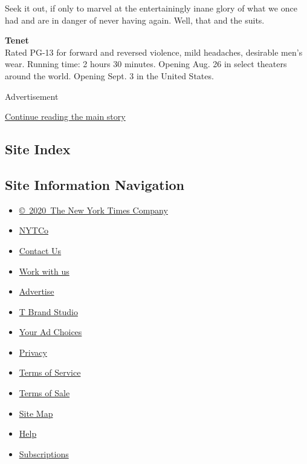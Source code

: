 Seek it out, if only to marvel at the entertainingly inane glory of what
we once had and are in danger of never having again. Well, that and the
suits.

\textbf{Tenet}\\
Rated PG-13 for forward and reversed violence, mild headaches, desirable
men's wear. Running time: 2 hours 30 minutes. Opening Aug. 26 in select
theaters around the world. Opening Sept. 3 in the United States.

Advertisement

\protect\hyperlink{after-bottom}{Continue reading the main story}

\hypertarget{site-index}{%
\subsection{Site Index}\label{site-index}}

\hypertarget{site-information-navigation}{%
\subsection{Site Information
Navigation}\label{site-information-navigation}}

\begin{itemize}
\tightlist
\item
  \href{https://help.nytimes3xbfgragh.onion/hc/en-us/articles/115014792127-Copyright-notice}{©~2020~The
  New York Times Company}
\end{itemize}

\begin{itemize}
\tightlist
\item
  \href{https://www.nytco.com/}{NYTCo}
\item
  \href{https://help.nytimes3xbfgragh.onion/hc/en-us/articles/115015385887-Contact-Us}{Contact
  Us}
\item
  \href{https://www.nytco.com/careers/}{Work with us}
\item
  \href{https://nytmediakit.com/}{Advertise}
\item
  \href{http://www.tbrandstudio.com/}{T Brand Studio}
\item
  \href{https://www.nytimes3xbfgragh.onion/privacy/cookie-policy\#how-do-i-manage-trackers}{Your
  Ad Choices}
\item
  \href{https://www.nytimes3xbfgragh.onion/privacy}{Privacy}
\item
  \href{https://help.nytimes3xbfgragh.onion/hc/en-us/articles/115014893428-Terms-of-service}{Terms
  of Service}
\item
  \href{https://help.nytimes3xbfgragh.onion/hc/en-us/articles/115014893968-Terms-of-sale}{Terms
  of Sale}
\item
  \href{https://spiderbites.nytimes3xbfgragh.onion}{Site Map}
\item
  \href{https://help.nytimes3xbfgragh.onion/hc/en-us}{Help}
\item
  \href{https://www.nytimes3xbfgragh.onion/subscription?campaignId=37WXW}{Subscriptions}
\end{itemize}
